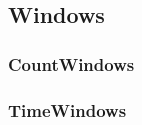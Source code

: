 \subsection{Windows}
\label{sect:windows}

\subsubsection{CountWindows}

\subsubsection{TimeWindows}
\label{sect:Timewindow}